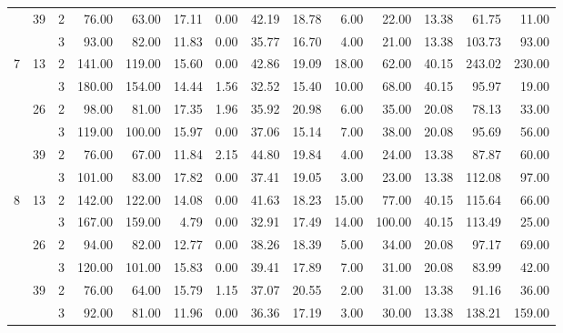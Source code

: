 \begin{tabular}{lllrrrrrrrrrrr}
\cline{2-14}
  & \multirow{2}{*}{39} & 2 &    76.00 &     63.00 & 17.11 &    0.00 &   42.19 &   18.78 &    6.00 &   22.00 &   13.38 &  61.75 &    11.00 \\
  &    & 3 &    93.00 &     82.00 & 11.83 &    0.00 &   35.77 &   16.70 &    4.00 &   21.00 &   13.38 & 103.73 &    93.00 \\
\cline{1-14}
\cline{2-14}
\multirow{6}{*}{7} & \multirow{2}{*}{13} & 2 &   141.00 &    119.00 & 15.60 &    0.00 &   42.86 &   19.09 &   18.00 &   62.00 &   40.15 & 243.02 &   230.00 \\
  &    & 3 &   180.00 &    154.00 & 14.44 &    1.56 &   32.52 &   15.40 &   10.00 &   68.00 &   40.15 &  95.97 &    19.00 \\
\cline{2-14}
  & \multirow{2}{*}{26} & 2 &    98.00 &     81.00 & 17.35 &    1.96 &   35.92 &   20.98 &    6.00 &   35.00 &   20.08 &  78.13 &    33.00 \\
  &    & 3 &   119.00 &    100.00 & 15.97 &    0.00 &   37.06 &   15.14 &    7.00 &   38.00 &   20.08 &  95.69 &    56.00 \\
\cline{2-14}
  & \multirow{2}{*}{39} & 2 &    76.00 &     67.00 & 11.84 &    2.15 &   44.80 &   19.84 &    4.00 &   24.00 &   13.38 &  87.87 &    60.00 \\
  &    & 3 &   101.00 &     83.00 & 17.82 &    0.00 &   37.41 &   19.05 &    3.00 &   23.00 &   13.38 & 112.08 &    97.00 \\
\cline{1-14}
\cline{2-14}
\multirow{6}{*}{8} & \multirow{2}{*}{13} & 2 &   142.00 &    122.00 & 14.08 &    0.00 &   41.63 &   18.23 &   15.00 &   77.00 &   40.15 & 115.64 &    66.00 \\
  &    & 3 &   167.00 &    159.00 &  4.79 &    0.00 &   32.91 &   17.49 &   14.00 &  100.00 &   40.15 & 113.49 &    25.00 \\
\cline{2-14}
  & \multirow{2}{*}{26} & 2 &    94.00 &     82.00 & 12.77 &    0.00 &   38.26 &   18.39 &    5.00 &   34.00 &   20.08 &  97.17 &    69.00 \\
  &    & 3 &   120.00 &    101.00 & 15.83 &    0.00 &   39.41 &   17.89 &    7.00 &   31.00 &   20.08 &  83.99 &    42.00 \\
\cline{2-14}
  & \multirow{2}{*}{39} & 2 &    76.00 &     64.00 & 15.79 &    1.15 &   37.07 &   20.55 &    2.00 &   31.00 &   13.38 &  91.16 &    36.00 \\
  &    & 3 &    92.00 &     81.00 & 11.96 &    0.00 &   36.36 &   17.19 &    3.00 &   30.00 &   13.38 & 138.21 &   159.00 \\
\cline{1-14}
\cline{2-14}

\end{tabular}
